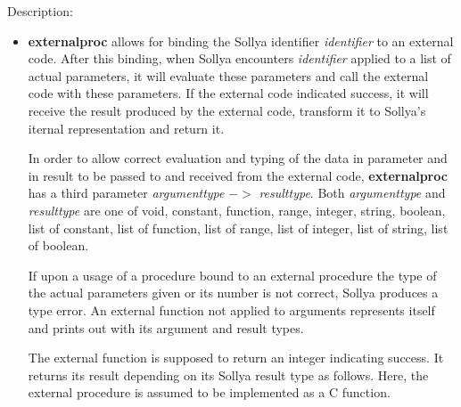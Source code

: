 \noindent Description: \begin{itemize}

\item \textbf{externalproc} allows for binding the Sollya identifier
   \emph{identifier} to an external code.  After this binding, when Sollya
   encounters \emph{identifier} applied to a list of actual parameters, it
   will evaluate these parameters and call the external code with these
   parameters. If the external code indicated success, it will receive
   the result produced by the external code, transform it to Sollya's
   iternal representation and return it.
    
   In order to allow correct evaluation and typing of the data in
   parameter and in result to be passed to and received from the external
   code, \textbf{externalproc} has a third parameter \emph{argumenttype} $->$ \emph{resulttype}.
   Both \emph{argumenttype} and \emph{resulttype} are one of void, constant,
   function, range, integer, string, boolean, list of constant, list of
   function, list of range, list of integer, list of string, list of
   boolean.
    
   If upon a usage of a procedure bound to an external procedure the type
   of the actual parameters given or its number is not correct, Sollya
   produces a type error. An external function not applied to arguments
   represents itself and prints out with its argument and result types.
    
   The external function is supposed to return an integer indicating
   success.  It returns its result depending on its Sollya result type
   as follows. Here, the external procedure is assumed to be implemented
   as a C function.
    

\end{itemize}

